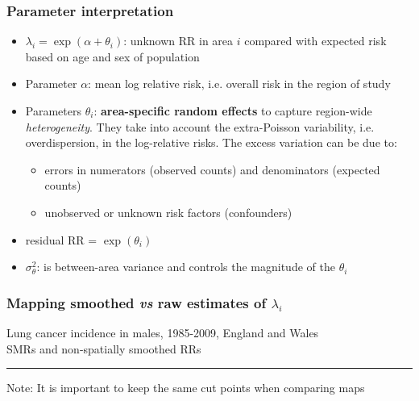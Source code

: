 \documentclass[12pt]{beamer}
\begin{document}
\begin{frame}
\frametitle{Parameter interpretation}
\begin{itemize} \setlength\itemsep{\fill}
\item  $\lambda_i=\exp (\alpha +  \theta_i)$: unknown RR in area $i$ compared with expected risk based on age and sex of population
  \item  Parameter $\alpha$: mean log relative risk, i.e. overall risk in the region of study
  \item  Parameters $\theta_i$: {\bf area-specific random effects} to capture region-wide \emph{heterogeneity}. They take into account the extra-Poisson variability, i.e.  \alert{overdispersion}, in the log-relative risks. The excess variation can be due to:
  \begin{itemize} \setlength\itemsep{\fill}
    \item errors in numerators (observed counts) and denominators (expected counts)
    \item unobserved or unknown risk factors (confounders)
  \end{itemize}
  \item  residual RR = $\exp (\theta_i)$
  \item $\sigma_{\theta}^2$: is between-area variance and controls the magnitude of the $\theta_i$ %
\end{itemize}
\end{frame}




\begin{frame}
    \frametitle{Mapping smoothed \emph{vs} raw estimates of $\lambda_i$}
    \begin{center}
    Lung cancer incidence in males, 1985-2009, England and Wales
        \\
        SMRs and non-spatially smoothed RRs
    \end{center}

\par\noindent\rule{\textwidth}{0.4pt}
\footnotesize{Note: It is important to keep the same cut points when comparing maps}
\end{frame}
\end{document}
